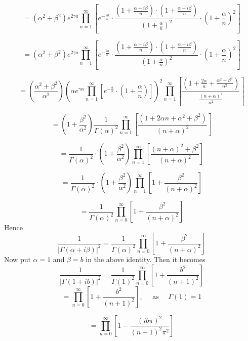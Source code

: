 \documentclass{article}
\begin{document}
\begin{flushleft}
$$
=\left(\alpha^{2}+\beta^{2}\right) e^{2 \gamma a} \prod_{n=1}^{\infty}\left[e^{-\frac{2 a}{n}} \cdot \frac{\left(1+\frac{\alpha+i \beta}{n}\right) \cdot\left(1+\frac{\alpha-i \beta}{n}\right)}{\left(1+\frac{\alpha}{n}\right)^{2}} \cdot\left(1+\frac{\alpha}{n}\right)^{2}\right]
$$

$$
=\left(\alpha^{2}+\beta^{2}\right) e^{2 \gamma a} \prod_{n=1}^{\infty}\left[e^{-\frac{2 a}{n}} \cdot \frac{\left(1+\frac{\alpha+i \beta}{n}\right) \cdot\left(1+\frac{\alpha-i \beta}{n}\right)}{\left(1+\frac{\alpha}{n}\right)^{2}} \cdot\left(1+\frac{\alpha}{n}\right)^{2}\right]
$$

$$
=\left(\frac{\alpha^{2}+\beta^{2}}{\alpha^{2}}\right)\left(\alpha e^{\gamma \alpha} \prod_{n=1}^{\infty}\left[e^{-\frac{a}{n}} \cdot\left(1+\frac{\alpha}{n}\right)\right]\right)^{2} \prod_{n=1}^{\infty}\left[\frac{\left(1+\frac{2 \alpha}{n}+\frac{\alpha^{2}+\beta^{2}}{n^{2}}\right)}{\frac{(n+\alpha)^{2}}{n^{2}}}\right]
$$


$$
=\left(1+\frac{\beta^{2}}{\alpha^{2}}\right) \frac{1}{\Gamma(\alpha)^{2}} \prod_{n=1}^{\infty}\left[\frac{\left(1+2 \alpha n+\alpha^{2}+\beta^{2}\right)}{(n+\alpha)^{2}}\right]
$$

$$
=\frac{1}{\Gamma(\alpha)^{2}} \cdot\left(1+\frac{\beta^{2}}{\alpha^{2}}\right) \prod_{n=1}^{\infty}\left[\frac{(n+\alpha)^{2}+\beta^{2}}{(n+\alpha)^{2}}\right]
$$

$$
=\frac{1}{\Gamma(\alpha)^{2}} \cdot\left(1+\frac{\beta^{2}}{\alpha^{2}}\right) \prod_{n=1}^{\infty}\left[1+\frac{\beta^{2}}{(n+\alpha)^{2}}\right]
$$

$$
=\frac{1}{\Gamma(\alpha)^{2}} \prod_{n=0}^{\infty}\left[1+\frac{\beta^{2}}{(n+\alpha)^{2}}\right]
$$
Hence
$$
\frac{1}{|\Gamma(\alpha+i \beta)|^{2}}=\frac{1}{\Gamma(\alpha)^{2}} \prod_{n=0}^{\infty}\left[1+\frac{\beta^{2}}{(n+\alpha)^{2}}\right]
$$
Now put $\alpha=1$ and $\beta=b$ in the above identity. Then it becomes
$$
\frac{1}{|\Gamma(1+i b)|^{2}}=\frac{1}{\Gamma(1)^{2}} \prod_{n=0}^{\infty}\left[1+\frac{b^{2}}{(n+1)^{2}}\right]
$$
$$
=\prod_{n=0}^{\infty}\left[1+\frac{b^{2}}{(n+1)^{2}}\right], \quad \text { as } \quad \Gamma(1)=1
$$

$$
=\prod_{n=0}^{\infty}\left[1-\frac{(i b \pi)^{2}}{(n+1)^{2} \pi^{2}}\right]
$$


\end{flushleft}
\end{document}
